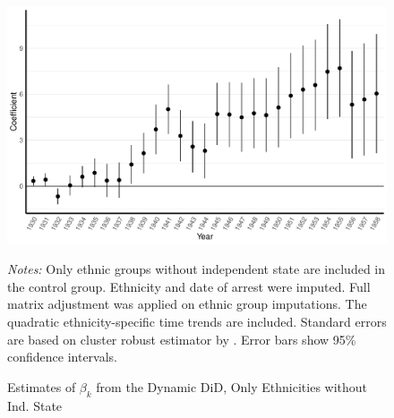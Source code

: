  \begin{figure}[h]
\centering
\caption{Estimates of $\beta_k$ from the Dynamic DiD, Only Ethnicities without Ind. State}
\includegraphics[width=\textwidth]{plots/effects/ethnicity_imputation/annual/pr_cr2_date_imp_full_years_not_ind_country.pdf}
\begin{minipage}{0.92\textwidth}
\footnotesize
\emph{Notes:} Only ethnic groups without independent state are included in the control group. Ethnicity and date of arrest were imputed.  Full matrix adjustment was applied on ethnic group imputations. The quadratic ethnicity-specific time trends are included.  Standard errors are based on cluster robust estimator by \citet{pustejovsky_small-sample_2018}. Error bars show 95\% confidence intervals. 
\end{minipage}
\label{fig:did_effets_no_ind_countries}
\end{figure}

%
